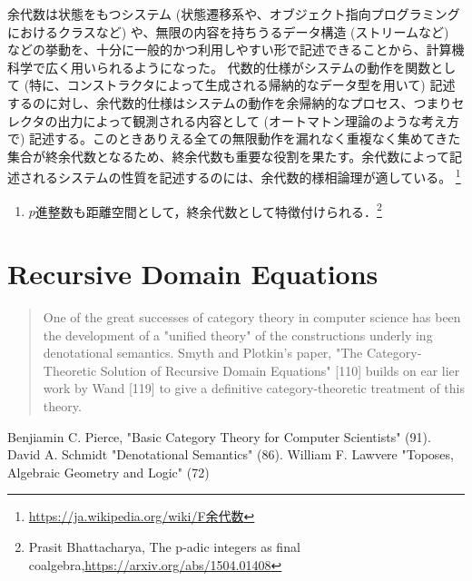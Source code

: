 \documentclass[uplatex, dvipdfmx]{jsreport}
\begin{document}
\begin{example}[余代数の例]
    余代数は状態をもつシステム (状態遷移系や、オブジェクト指向プログラミングにおけるクラスなど) や、無限の内容を持ちうるデータ構造 (ストリームなど) などの挙動を、十分に一般的かつ利用しやすい形で記述できることから、計算機科学で広く用いられるようになった。
    代数的仕様がシステムの動作を関数として (特に、コンストラクタによって生成される帰納的なデータ型を用いて) 記述するのに対し、余代数的仕様はシステムの動作を余帰納的なプロセス、つまりセレクタの出力によって観測される内容として (オートマトン理論のような考え方で) 記述する。このときありえる全ての無限動作を漏れなく重複なく集めてきた集合が終余代数となるため、終余代数も重要な役割を果たす。余代数によって記述されるシステムの性質を記述するのには、余代数的様相論理が適している。 
    \footnote{\url{https://ja.wikipedia.org/wiki/F余代数}}
    \begin{enumerate}
        \item $p$進整数も距離空間として，終余代数として特徴付けられる．\footnote{Prasit Bhattacharya, The p-adic integers as final coalgebra,\url{https://arxiv.org/abs/1504.01408}}
    \end{enumerate}
\end{example}

\section{Recursive Domain Equations}

\begin{quotation}
    One of the great successes of category theory in computer science has been the development of a "unified theory" of the constructions underly­ ing denotational semantics. Smyth and Plotkin's paper, "The Category­ Theoretic Solution of Recursive Domain Equations" [110] builds on ear­ lier work by Wand [119] to give a definitive category-theoretic treatment of this theory.\cite{Pierce}
\end{quotation}

\begin{thebibliography}{99}
    Benjiamin C. Pierce, "Basic Category Theory for Computer Scientists" (91).
    David A. Schmidt "Denotational Semantics" (86).
    William F. Lawvere "Toposes, Algebraic Geometry and Logic" (72)
\end{thebibliography}
\end{document}
